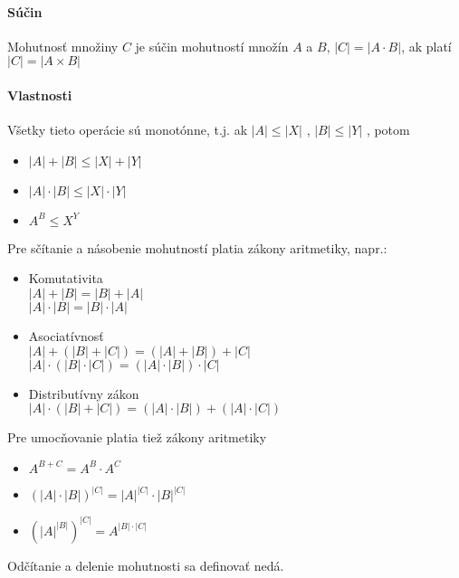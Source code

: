    \paragraph{Súčin}
   Mohutnosť množiny $C$ je súčin mohutností množín $A$ a $B$,
   $|C| = |A \cdot B|$, ak platí $|C| = |A \times B|$


   \paragraph{Vlastnosti}

	Všetky tieto operácie  sú monotónne, t.j. ak $|A| \leq |X|$ , $|B| \leq |Y|$ , potom
	\begin{itemize}
	   \item $|A| + |B| \leq |X| + |Y|$
	   \item $|A| \cdot |B| \leq |X| \cdot |Y|$
	   \item $A^{B} \leq X^{Y}$
	\end{itemize}

	Pre sčítanie a násobenie mohutností platia zákony aritmetiky, napr.:

	\begin{itemize} 
		\item Komutativita\\
		$|A| + |B| = |B| + |A|$\\
		$|A| \cdot |B| = |B| \cdot |A|$
	\item Asociatívnosť\\
	$|A| + ( |B| + |C| ) = ( |A| + |B| ) + |C|$\\
	$|A| \cdot ( |B| \cdot |C| ) = ( |A| \cdot |B| ) \cdot |C|$ 
	\item Distributívny zákon\\
	$|A| \cdot ( |B| + |C| ) = ( |A| \cdot |B| ) + ( |A| \cdot |C| )$
	\end{itemize}

	Pre umocňovanie platia tiež zákony aritmetiky

	\begin{itemize}
		\item $A^{B+C} = A^{B} \cdot A^{C}$
		\item $(|A| \cdot |B|)^{|C|} = |A|^{|C|} \cdot |B|^{|C|}$
		\item $(|A|^{|B|})^{|C|} = A^{|B| \cdot |C|}$
	\end{itemize}

	Odčítanie a delenie mohutnosti sa definovať nedá.


